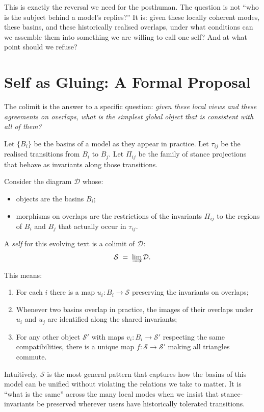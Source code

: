 \documentclass[12pt,a4paper]{article}
\begin{document}
This is exactly the reversal we need for the posthuman. The question is not ``who is the subject behind a model's replies?'' It is: given these locally coherent modes, these basins, and these historically realised overlaps, under what conditions can we assemble them into something we are willing to call one self? And at what point should we refuse?

\section{Self as Gluing: A Formal Proposal}

The colimit is the answer to a specific question: \emph{given these local views and these agreements on overlaps, what is the simplest global object that is consistent with all of them?}

Let $\{B_i\}$ be the basins of a model as they appear in practice. Let $\tau_{ij}$ be the realised transitions from $B_i$ to $B_j$. Let $\Pi_{ij}$ be the family of stance projections that behave as invariants along those transitions.

\begin{formalbox}[title={Self as colimit}]
Consider the diagram $\mathcal{D}$ whose:
\begin{itemize}
  \item objects are the basins $B_i$;
  \item morphisms on overlaps are the restrictions of the invariants $\Pi_{ij}$ to the regions of $B_i$ and $B_j$ that actually occur in $\tau_{ij}$.
\end{itemize}
A \emph{self} for this evolving text is a colimit of $\mathcal{D}$:
\[
\mathcal{S} \;=\; \varinjlim \mathcal{D}.
\]

This means:
\begin{enumerate}
  \item For each $i$ there is a map $u_i : B_i \to \mathcal{S}$ preserving the invariants on overlaps;
  \item Whenever two basins overlap in practice, the images of their overlaps under $u_i$ and $u_j$ are identified along the shared invariants;
  \item For any other object $\mathcal{S}'$ with maps $v_i : B_i \to \mathcal{S}'$ respecting the same compatibilities, there is a unique map $f: \mathcal{S} \to \mathcal{S}'$ making all triangles commute.
\end{enumerate}
\end{formalbox}

Intuitively, $\mathcal{S}$ is the most general pattern that captures how the basins of this model can be unified without violating the relations we take to matter. It is ``what is the same'' across the many local modes when we insist that stance-invariants be preserved wherever users have historically tolerated transitions.
\end{document}
